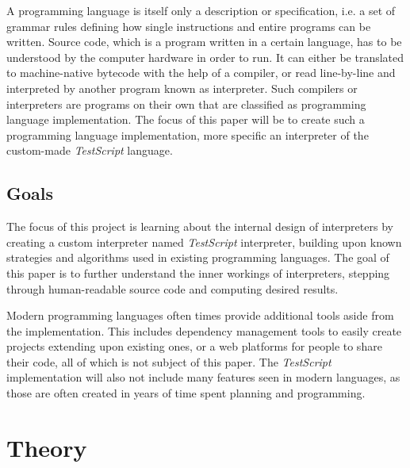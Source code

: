 \documentclass[12pt,a4paper]{article}
\newcommand{\name}{\emph{TestScript}}
\begin{document}
A programming language is itself only a description or specification, i.e. a
set of grammar rules defining how single instructions and entire programs
can be written. Source code, which is a program written in a certain language,
has to be understood by the computer hardware in order to run. It can either
be translated to machine-native bytecode with the help of a compiler, or
read line-by-line and interpreted by another program known as interpreter.
Such compilers or interpreters are programs on their own that are classified
as programming language implementation. The focus of this paper will be to
create such a programming language implementation, more specific an interpreter
of the custom-made \name{} language.

\subsection{Goals}
The focus of this project is learning about the internal design of interpreters
by creating a custom interpreter named \name{} interpreter, building upon
known strategies and algorithms used in existing programming languages.
The goal of this paper is to further understand the inner workings of
interpreters, stepping through human-readable source code and computing
desired results.

Modern programming languages often times provide additional tools aside from
the implementation. This includes dependency management tools to
easily create projects extending upon existing ones, or a web platforms for
people to share their code, all of which is not subject of this paper.
The \name{} implementation will also not include many features seen in modern
languages, as those are often created in years of time spent planning and
programming.

\section{Theory}
\end{document}
